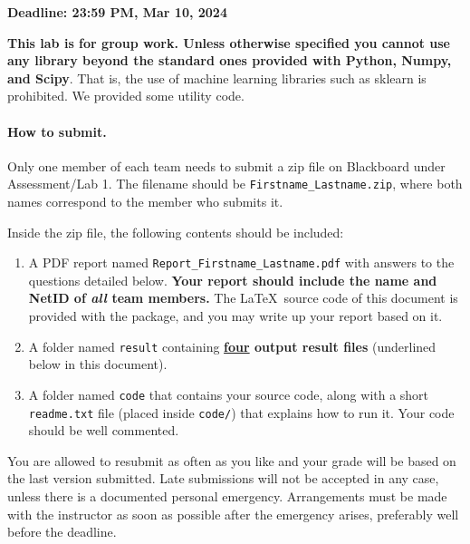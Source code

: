 \documentclass[11pt]{report}
\begin{document}
	
	\maketitle
	
	{\bf Deadline: 23:59 PM, Mar 10, 2024}
	
	
	{\bf This lab is for group work.
		Unless otherwise specified you cannot use any library beyond the standard ones provided with Python, Numpy, and Scipy}.
	That is, the use of machine learning libraries such as sklearn is prohibited.
	We provided some utility code.
	
	
	
	\paragraph{How to submit.}
	
	Only one member of each team needs to submit a zip file on Blackboard under Assessment/Lab 1.
	The filename should be \verb#Firstname_Lastname.zip#,
	where both names correspond to the member who submits it.
	
	
	Inside the zip file, the following contents should be included:
	\begin{enumerate}
		\item  A PDF report named \verb#Report_Firstname_Lastname.pdf# with answers to the questions detailed below.
		{\bf Your report should include the name and NetID of \emph{all} team members.}
		The \LaTeX\ source code of this document is provided with the package, and you may write up your report based on it.
		\item A folder named \verb#result# containing {\bf \underline{four} output result files} (underlined below in this document).
		\item A folder named \verb#code# that contains your source code, along with a short \verb#readme.txt# file (placed inside \verb#code/#) that explains how to run it.
		Your code should be well commented.
	\end{enumerate}
	
	
	
	You are allowed to resubmit as often as you like and your grade will be based on the last version submitted.
	Late submissions will not be accepted in any case, 
	unless there is a documented personal emergency.  
	Arrangements must be made with the instructor as soon as possible after the emergency arises,
	preferably well before the deadline.
	
\end{document}
